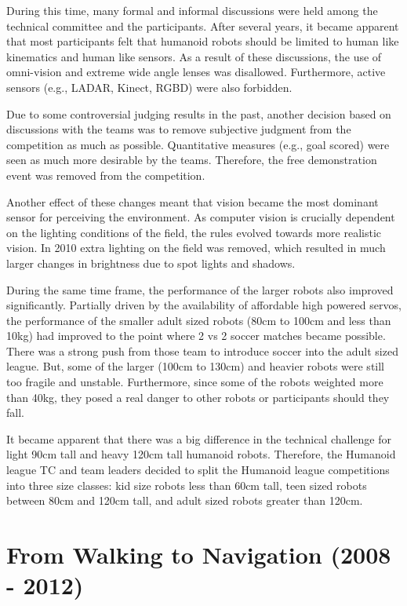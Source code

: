 \documentclass{llncs}
\begin{document}
During this time, many formal and informal discussions were held among
the technical committee and the participants. After several years, it
became apparent that most participants felt that humanoid robots
should be limited to human like kinematics and human like sensors. As
a result of these discussions, the use of omni-vision and extreme wide
angle lenses was disallowed. Furthermore, active sensors (e.g., LADAR,
Kinect, RGBD) were also forbidden.

Due to some controversial judging results in the past, another
decision based on discussions with the teams was to remove subjective
judgment from the competition as much as possible. Quantitative
measures (e.g., goal scored) were seen as much more desirable by the
teams. Therefore, the free demonstration event was removed from the
competition.

Another effect of these changes meant that vision became the most
dominant sensor for perceiving the environment. As computer vision is
crucially dependent on the lighting conditions of the field, the rules
evolved towards more realistic vision. In 2010 extra lighting on the
field was removed, which resulted in much larger changes in brightness
due to spot lights and shadows.

During the same time frame, the performance of the larger robots also
improved significantly. Partially driven by the availability of
affordable high powered servos, the performance of the smaller adult
sized robots (80cm to 100cm and less than 10kg) had improved to the
point where 2 vs 2 soccer matches became possible. There was a strong
push from those team to introduce soccer into the adult sized
league. But, some of the larger (100cm to 130cm) and heavier robots
were still too fragile and unstable. Furthermore, since some of the
robots weighted more than 40kg, they posed a real danger to other
robots or participants should they fall.

It became apparent that there was a big difference in the technical
challenge for light 90cm tall and heavy 120cm tall humanoid
robots. Therefore, the Humanoid league TC and team leaders decided to
split the Humanoid league competitions into three size classes: kid
size robots less than 60cm tall, teen sized robots between 80cm and
120cm tall, and adult sized robots greater than 120cm.
 
\section{From Walking to Navigation (2008 - 2012)}
\label{sec:three}
\end{document}
